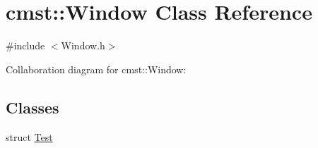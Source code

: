\hypertarget{classcmst_1_1_window}{}\section{cmst::Window Class Reference}
\label{classcmst_1_1_window}


{\ttfamily \#include $<$Window.h$>$}



Collaboration diagram for cmst::Window:
\subsection*{Classes}
\begin{DoxyCompactItemize}
\item 
struct \hyperlink{structcmst_1_1_window_1_1_test}{Test}
\end{DoxyCompactItemize}

